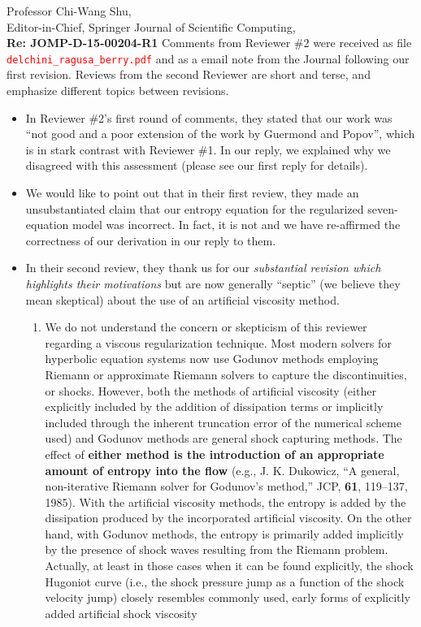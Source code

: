 \documentclass[11pt]{letter}
\newcommand{\tcr}[1]{\textcolor{red}{#1}}
\begin{document}
\begin{letter}{Professor Chi-Wang Shu, \\  Editor-in-Chief, Springer Journal of Scientific Computing,\\
\textbf{Re: JOMP-D-15-00204-R1}}
Comments from Reviewer \#2 were received as file \tcr{{\tt delchini\_ragusa\_berry.pdf}}
and as a email note from the Journal following our first revision. Reviews from the second Reviewer are short and terse,
and emphasize different topics between revisions.
\begin{itemize}
\item 
In Reviewer \#2's first round of comments, 
they stated that our work was ``not good and a poor extension of the work by Guermond and Popov'', which is in stark
contrast with Reviewer \#1. In our reply, we explained why we disagreed with this assessment (please see our first reply for details). 
\item We would like to point out that in their first review, they made an unsubstantiated  claim that our entropy equation for the 
regularized seven-equation model was incorrect. In fact, it is not and we have re-affirmed the correctness of our derivation in our reply to them. 
\item In their second review, they thank us for our {\it substantial revision which highlights their motivations} but are now generally ``septic'' (we believe they mean skeptical) about the use of an artificial viscosity method. 
\begin{enumerate}
\item We do not understand the concern or skepticism of this reviewer regarding a viscous regularization technique.
Most modern solvers for hyperbolic equation systems now use Godunov methods employing
Riemann or approximate Riemann solvers to capture the discontinuities, or shocks. However,
both the methods of artificial viscosity (either explicitly included by the addition of
dissipation terms or implicitly included through the inherent truncation error of the numerical
scheme used) and Godunov methods are general shock capturing methods. The effect
of {\bf either method is the introduction of an appropriate amount of entropy into the flow} 
(e.g., J. K. Dukowicz, ``A general, non-iterative Riemann solver for Godunov’s method,'' JCP, {\bf 61}, 119--137, 1985).
With the artificial viscosity methods, the entropy is added by the dissipation produced by
the incorporated artificial viscosity. On the other hand, with Godunov methods, the entropy
is primarily added implicitly by the presence of shock waves resulting from the Riemann
problem. Actually, at least in those cases when it can be found explicitly, the shock Hugoniot
curve (i.e., the shock pressure jump as a function of the shock velocity jump) closely
resembles commonly used, early forms of explicitly added artificial shock viscosity 

\end{enumerate}
\end{itemize}
\end{letter}
\end{document}
